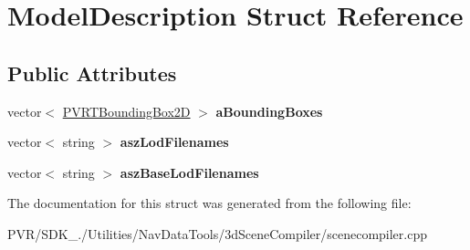 \hypertarget{struct_model_description}{\section{Model\+Description Struct Reference}
\label{struct_model_description}
}
\subsection*{Public Attributes}
\begin{DoxyCompactItemize}
\item 
\hypertarget{struct_model_description_a2b21b3adf21b3fd5b73dc47b1d48997d}{vector$<$ \hyperlink{structpvrnavigation_1_1_p_v_r_t_bounding_box2_d}{P\+V\+R\+T\+Bounding\+Box2\+D} $>$ {\bfseries a\+Bounding\+Boxes}}\label{struct_model_description_a2b21b3adf21b3fd5b73dc47b1d48997d}

\item 
\hypertarget{struct_model_description_a7e59d73ccf1c74db45b13788ed1e2604}{vector$<$ string $>$ {\bfseries asz\+Lod\+Filenames}}\label{struct_model_description_a7e59d73ccf1c74db45b13788ed1e2604}

\item 
\hypertarget{struct_model_description_a2426b06aceea24ca1f660d5140944e98}{vector$<$ string $>$ {\bfseries asz\+Base\+Lod\+Filenames}}\label{struct_model_description_a2426b06aceea24ca1f660d5140944e98}

\end{DoxyCompactItemize}


The documentation for this struct was generated from the following file\+:\begin{DoxyCompactItemize}
\item 
P\+V\+R/\+S\+D\+K\+\_./\+Utilities/\+Nav\+Data\+Tools/3d\+Scene\+Compiler/scenecompiler.\+cpp\end{DoxyCompactItemize}
